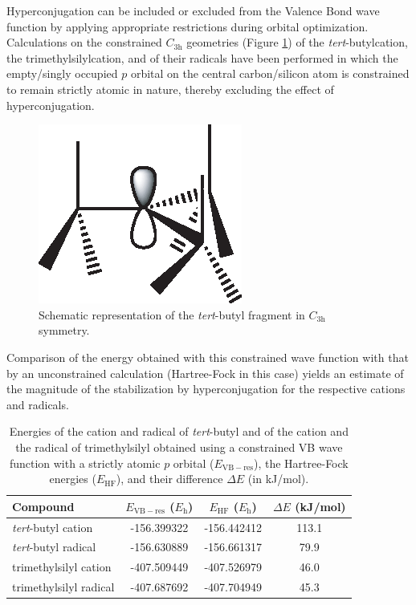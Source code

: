 Hyperconjugation can be included or excluded from the Valence Bond wave function by applying appropriate restrictions during orbital optimization.  Calculations on the constrained $C_\mathrm{3h}$ geometries (Figure \ref{ch3.fig.c3h}) of the \textit{tert}-butylcation, the trimethylsilylcation, and of their radicals have been performed in which the empty/singly occupied $p$ orbital on the central carbon/silicon atom is constrained to remain strictly atomic in nature, thereby excluding the effect of hyperconjugation.
\begin{figure}[ht]
\center
\includegraphics{dissociation/figures/c3h.eps}
\caption{Schematic representation of the \textit{tert}-butyl fragment in $C_\mathrm{3h}$ symmetry.}
\label{ch3.fig.c3h}
\end{figure}
Comparison of the energy obtained with this constrained wave function with that by an unconstrained calculation  (Hartree-Fock in this case) yields an estimate of the magnitude of the stabilization by hyperconjugation for the respective cations and radicals. 

\begin{table}[htp]
\center
\caption{Energies of the cation and radical of \textit{tert}-butyl and of the cation and the radical of trimethylsilyl obtained using a constrained VB wave function with a strictly atomic $p$ orbital ($E_\mathrm{VB-res}$), the Hartree-Fock energies ($E_\mathrm{HF}$), and their difference $\Delta E$ (in kJ/mol).}
\label{ch3.tab.hyp}
\begin{tabular}{l c c c}
\hline
\textbf{Compound} & $E_\mathrm{VB-res}$ ($E_{\mathrm{h}}$) &$E_\mathrm{HF}$ ($E_{\mathrm{h}}$)& $\Delta E$ (kJ/mol)  \\
\hline
\textit{tert}-butyl cation & -156.399322 &-156.442412&113.1  \\
\textit{tert}-butyl radical & -156.630889 &-156.661317&79.9 \\
trimethylsilyl cation & -407.509449&-407.526979&46.0 \\
trimethylsilyl radical &-407.687692&-407.704949&45.3 \\
\end{tabular}
\end{table}

